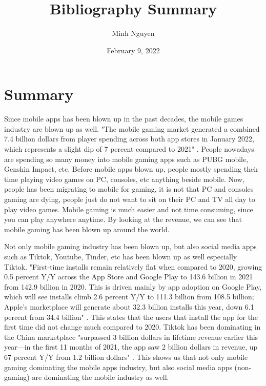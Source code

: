 \documentclass{article}
\title{Bibliography Summary}
\author{Minh Nguyen}
\date{February 9, 2022}
\begin{document}
\maketitle

\section*{Summary}
Since mobile apps has been blown up in the past decades, the mobile games industry are blown up as well. "The mobile gaming market generated a combined 7.4 billion dollars from player spending across both app stores in January 2022, which represents a slight dip of 7 percent compared to 2021" \cite{anne2022}. People nowadays are spending so many money into mobile gaming apps such as PUBG mobile, Genshin Impact, etc. Before mobile apps blown up, people mostly spending their time playing video games on PC, consoles, etc anything beside mobile. Now, people has been migrating to mobile for gaming, it is not that PC and consoles gaming are dying, people just do not want to sit on their PC and TV all day to play video games. Mobile gaming is much easier and not time consuming, since you can play anywhere anytime. By looking at the revenue, we can see that mobile gaming has been blown up around the world.

\medskip

Not only mobile gaming industry has been blown up, but also social media apps such as Tiktok, Youtube, Tinder, etc has been blown up as well especially Tiktok. "First-time installs remain relatively flat when compared to 2020, growing 0.5 percent Y/Y across the App Store and Google Play to 143.6 billion in 2021 from 142.9 billion in 2020. This is driven mainly by app adoption on Google Play, which will see installs climb 2.6 percent Y/Y to 111.3 billion from 108.5 billion; Apple's marketplace will generate about 32.3 billion installs this year, down 6.1 percent from 34.4 billion" \cite{stephanie2021}. This states that the users that install the app for the first time did not change much compared to 2020. Tiktok has been dominating in the China marketplace "surpassed 3 billion dollars in lifetime revenue earlier this year—in the first 11 months of 2021, the app saw 2 billion dollars in revenue, up 67 percent Y/Y from 1.2 billion dollars" \cite{stephanie2021}. This shows us that not only mobile gaming dominating the mobile apps industry, but also social media apps (non-gaming) are dominating the mobile industry as well.

\printbibliography
\end{document}

